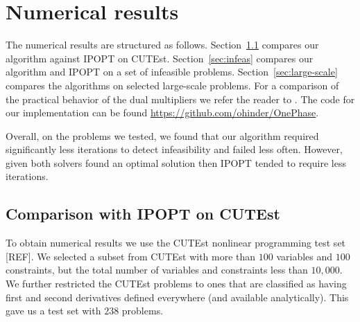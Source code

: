\documentclass{article}
\begin{document}

\section{Numerical results}\label{sec:numerical-results}

 The numerical results are structured as follows. Section~\ref{alg:comparison-IPOPT} compares our algorithm against IPOPT on CUTEst. Section~\ref{sec:infeas} compares our algorithm and IPOPT on a set of infeasible problems. Section~\ref{sec:large-scale} compares the algorithms on selected large-scale problems. For a comparison of the practical behavior of the dual multipliers we refer the reader to \cite{haeser2017behavior}. The code for our implementation can be found \url{https://github.com/ohinder/OnePhase}.
 
 
Overall, on the problems we tested, we found that our algorithm required significantly less iterations to detect infeasibility and failed less often. However, given both solvers found an optimal solution then IPOPT tended to require less iterations.

 

\subsection{Comparison with IPOPT on CUTEst}\label{alg:comparison-IPOPT}

To obtain numerical results we use the CUTEst nonlinear programming test set [REF]. We selected a subset from CUTEst with more than $100$ variables and $100$ constraints, but the total number of variables and constraints less than $10,000$. We further restricted the CUTEst problems to ones that are classified as having first and second derivatives defined everywhere (and available analytically). This gave us a test set with $238$ problems.
\end{document}
